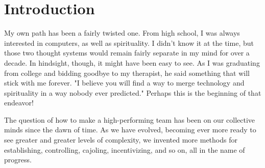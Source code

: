 \chapter{Introduction}

My own path has been a fairly twisted one. From high school, I was always interested in computers, as well as
spirituality. I didn't know it at the time, but those two thought systems would remain fairly separate in my mind
for over a decade. In hindsight, though, it might have been easy to see. As I was graduating from college
and bidding goodbye to my therapist, he said something that will stick with me forever. "I believe you will find
a way to merge technology and spirituality in a way nobody ever predicted." Perhaps this is the beginning
of that endeavor!

The question of how to make a high-performing team has been on our collective minds since the dawn of time.
As we have evolved, becoming ever more ready to see greater and greater levels of complexity, we invented
more methods for establishing, controlling, cajoling, incentivizing, and so on, all in the name of progress.